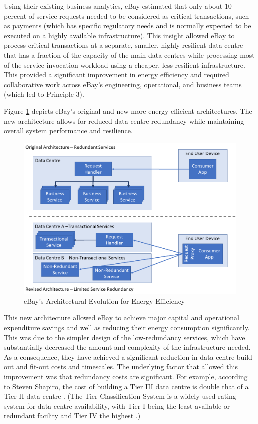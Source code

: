 Using their existing business analytics, eBay estimated that only about 10 percent of service requests needed to be considered as critical transactions, such as payments (which has specific regulatory needs and is normally expected to be executed on a highly available infrastructure). This insight allowed eBay to process critical transactions at a separate, smaller, highly resilient data centre that has a fraction of the capacity of the main data centres \cite{nelson2013-ebaycasestudy} while processing most of the service invocation workload using a cheaper, less resilient infrastructure. This provided a significant improvement in energy efficiency and required collaborative work across eBay's engineering, operational, and business teams (which led to Principle 3).

Figure \ref{figure:styles} depicts eBay's original and new more energy-efficient architectures. The new architecture allows for reduced data centre redundancy while maintaining overall system performance and resilience.

\begin{figure}
\centering
\includegraphics[width=\textwidth]{Figures/principles-styles}
\caption{eBay's Architectural Evolution for Energy Efficiency}
\label{figure:styles}
\end{figure}

This new architecture allowed eBay to achieve major capital and operational expenditure savings and well as reducing their energy consumption significantly. This was due to the simpler design of the low-redundancy services, which have substantially decreased the amount and complexity of the infrastructure needed.  As a consequence, they have achieved a significant reduction in data centre build-out and fit-out costs and timescales. The underlying factor that allowed this improvement was that redundancy costs are significant. For example, according to Steven Shapiro, the cost of building a Tier III data centre is double that of a Tier II data centre \cite{shapiro2015-datacentre-mythsrealities}. (The Tier Classification System is a widely used rating system for data centre availability, with Tier I being the least available or redundant facility and Tier IV the highest \cite{uptime2015-tierclassification}.)

